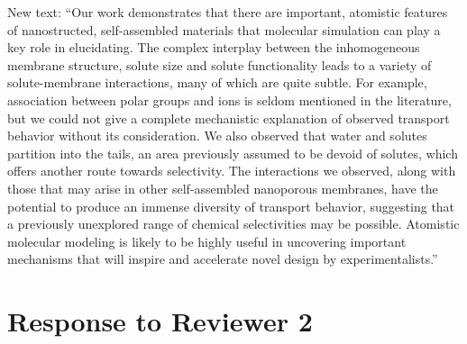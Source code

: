 \documentclass{article}
\begin{document}
\begin{enumerate}
    New text: ``Our work demonstrates that there are important, atomistic features of nanostructed, 
    self-assembled materials that molecular simulation can play a key role in elucidating.
    The complex interplay between the inhomogeneous membrane structure, solute size and 
    solute functionality leads to a variety of solute-membrane interactions, many of which
    are quite subtle. For example, association between polar groups and ions is seldom 
    mentioned in the literature, but we could not give a complete mechanistic explanation
    of observed transport behavior without its consideration. 
    We also observed that water and solutes partition into the tails, an area previously 
    assumed to be devoid of solutes, which offers another route towards selectivity.
    The interactions we observed, along with those that may arise in other self-assembled
    nanoporous membranes, have the potential to produce an immense diversity of transport
    behavior, suggesting that a previously unexplored range of chemical selectivities may
    be possible. Atomistic molecular modeling is likely to be highly useful in uncovering 
    important mechanisms that will inspire and accelerate novel design by experimentalists.''
	
\end{enumerate}

\section*{Response to Reviewer 2}
\end{document}
